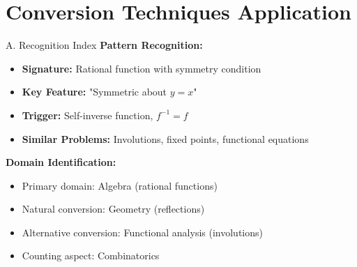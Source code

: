 \documentclass[12pt]{article}
\begin{document}
\section{Conversion Techniques Application}

\begin{conversionbox}{A. Recognition Index}
\textbf{Pattern Recognition:}
\begin{itemize}
    \item \textbf{Signature:} Rational function with symmetry condition
    \item \textbf{Key Feature:} "Symmetric about $y=x$"
    \item \textbf{Trigger:} Self-inverse function, $f^{-1}=f$
    \item \textbf{Similar Problems:} Involutions, fixed points, functional equations
\end{itemize}

\textbf{Domain Identification:}
\begin{itemize}
    \item Primary domain: Algebra (rational functions)
    \item Natural conversion: Geometry (reflections)
    \item Alternative conversion: Functional analysis (involutions)
    \item Counting aspect: Combinatorics
\end{itemize}
\end{conversionbox}
\end{document}
